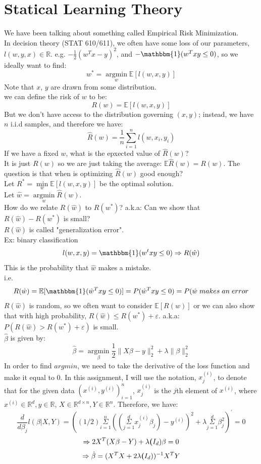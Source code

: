\documentclass[twoside]{article}
\theoremstyle{definition}
\theoremstyle{definition}
\theoremstyle{remark}
\def\R{{\mathbb R}}
\def\E{{\mathbb E}}
\begin{document}
\section{Statical Learning Theory}
We have been talking about something called Empirical Risk Minimization. \\
In decision theory (STAT 610/611), we often have some loss of our parameters, $l(w,y,x) \in \R$. e.g. $-\frac{1}{2}(w^Tx - y)^2$, and $-\mathbbm{1}(w^Txy \leq 0)$, so we ideally want to find:
\[w^* = \underset{w}{\operatorname{argmin}}\E[l(w,x,y)]\]
Note that $x$, $y$ are drawn from some distribution. \\
we can define the risk of $w$ to be:
\[R(w) = \E[l(w,x,y)]\]
But we don't have access to the distribution governing $(x,y)$; instead, we have $n$ i.i.d samples, and therefore we have:
\[\hat R (w) = \frac{1}{n} \sum_{i=1}^n l(w,x_i,y_i)\]
If we have a fixed $w$, what is the epxected value of $\hat R (w)$? \\
It is just $R(w)$ so we are just taking the average: $\E \hat R (w) = R(w)$.
The question is that when is optimizing $\hat R (w)$ good enough?\\
Let $R^* = \underset{w}{\operatorname{min}}\E[l(w,x,y)]$ be the optimal solution.\\
Let $\hat w = \underset{w}{\operatorname{argmin}} \hat R (w)$. \\
How do we relate $R(\hat w)$ to $R(w^*)$? a.k.a: Can we show that  $R(\hat w) - R(w^*)$ is small?\\
$R(\hat w)$ is called "generalization error".\\
Ex: binary classification \\
\[l(w,x,y) = \mathbbm{1} (w^t x y \leq 0) \Rightarrow R(\hat w)\]
This is the probability that $\hat w$ makes a mistake. \\
i.e. \[R(\hat w) = \E [\mathbbm{1}(\hat w^T xy \leq 0)] = P(\hat w^T xy \leq 0)= P(\hat w\; makes \; an \; error\]
$R(\hat w)$ is random, so we often want to consider $\E[R(w)]$ or we can also show that with high probability, $R(\hat w) \leq R(w^*) + \varepsilon$. a.k.a: $P(R(\hat w) > R(w^*)+ \varepsilon)$ is small.\\ 







$\hat \beta$ is given by:\[ \hat \beta = \underset{\beta}{\operatorname{argmin}}  \frac{1}{2}\|X\beta - y\|_2^2 + \lambda\|\beta\|_2^2\] 
In order to find $argmin$, we need to take the derivative of the loss function and make it equal to 0. In this assignment, I will use
the notation, $x_j^{(i)}$, to denote that for the given data ${(x^{(i)},y^{(i)})}_{i=1}^n$, $x_j^{(i)}$ is the $j$th element of $x^{(i)}$, where $x^{(i)} \in \R^d, y \in \R$, $X \in \R^{d\times n}, Y \in \R^n$. 
Therefore, we have:
\[ \frac{d}{d\beta_j}l(\beta | X,Y) = ((1/2)\overset{n}{\underset{i=1}{{\Sigma}}}((\overset{d}{\underset{j=1}{{\Sigma}}}x_j^{(i)}\beta_j) - y^{(i)})^2 + \lambda\overset{d}{\underset{j=1}{{\Sigma}}}\beta_j^2)^\prime = 0\]
\[ \Rightarrow 2X^T(X\beta - Y) + \lambda\textbf(I_d)\beta = 0\]
\[ \Rightarrow \hat \beta = (X^TX + 2\lambda\textbf(I_d))^{-1}X^TY\]
\end{document}
